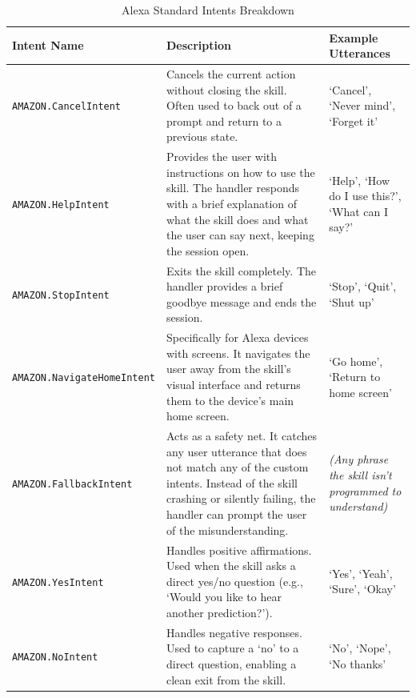 \begin{table}[H]
    \centering
    \small
    \begin{tabularx}{\textwidth}{@{} l >{\raggedright\arraybackslash}X >{\raggedright\arraybackslash}p{3.5cm} @{}}
        \toprule
        \textbf{Intent Name} & \textbf{Description} & \textbf{Example Utterances} \\
        \midrule
        \texttt{AMAZON.CancelIntent} & Cancels the current action without closing the skill. Often used to back out of a prompt and return to a previous state. & `Cancel', `Never mind', `Forget it' \\
        \midrule
        \texttt{AMAZON.HelpIntent} & Provides the user with instructions on how to use the skill. The handler responds with a brief explanation of what the skill does and what the user can say next, keeping the session open. & `Help', `How do I use this?', `What can I say?' \\
        \midrule
        \texttt{AMAZON.StopIntent} & Exits the skill completely. The handler provides a brief goodbye message and ends the session. & `Stop', `Quit', `Shut up' \\
        \midrule
        \texttt{AMAZON.NavigateHomeIntent} & Specifically for Alexa devices with screens. It navigates the user away from the skill's visual interface and returns them to the device's main home screen. & `Go home', `Return to home screen' \\
        \midrule
        \texttt{AMAZON.FallbackIntent} & Acts as a safety net. It catches any user utterance that does not match any of the custom intents. Instead of the skill crashing or silently failing, the handler can prompt the user of the misunderstanding. & \textit{(Any phrase the skill isn't programmed to understand)} \\
        \midrule
        \texttt{AMAZON.YesIntent} & Handles positive affirmations. Used when the skill asks a direct yes/no question (e.g., `Would you like to hear another prediction?'). & `Yes', `Yeah', `Sure', `Okay' \\
        \midrule
        \texttt{AMAZON.NoIntent} & Handles negative responses. Used to capture a `no' to a direct question, enabling a clean exit from the skill. & `No', `Nope', `No thanks' \\
        \bottomrule
    \end{tabularx}
    \caption{Alexa Standard Intents Breakdown}
    \label{tab:alexa_standard_intents}
\end{table}

